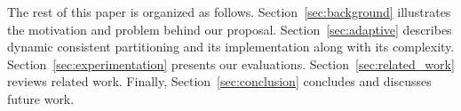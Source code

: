 
The rest of this paper is organized as
follows. Section~\ref{sec:background} illustrates the motivation and
problem behind our proposal.  Section~\ref{sec:adaptive} describes
dynamic consistent partitioning and its implementation along with its
complexity. Section~\ref{sec:experimentation} presents our
evaluations.  Section~\ref{sec:related_work} reviews related
work. Finally, Section~\ref{sec:conclusion} concludes and discusses
future work.
  

